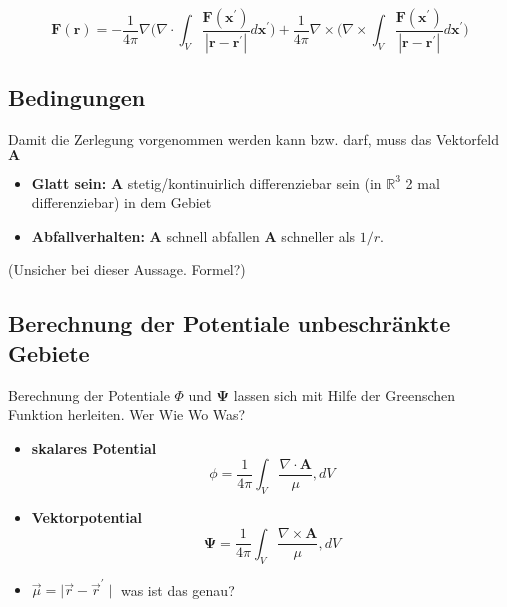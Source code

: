 \begin{equation}
\mathbf{F}(\mathbf{r}) = - \frac{1}{4 \pi} \nabla \bigg( \nabla \cdot \int_V \frac{\mathbf{F}(\mathbf{x}^{\prime})}{|\mathbf{r} - \mathbf{r}^{\prime}|} d\mathbf{x}^{\prime} \bigg) + \frac{1}{4 \pi} \nabla \times \bigg( \nabla \times \int_V \frac{\mathbf{F}(\mathbf{x}^{\prime})}{|\mathbf{r} - \mathbf{r}^{\prime}|} d\mathbf{x}^{\prime} \bigg)
\end{equation}


\subsection{Bedingungen
\label{helmholtz:subsection:Bedingung}}

Damit die Zerlegung vorgenommen werden kann bzw. darf, muss das Vektorfeld $\mathbf{A}$ 

\begin{itemize}
\item \textbf{Glatt sein:} $\mathbf{A}$ stetig/kontinuirlich differenziebar sein (in $\mathbb{R}^3$ 2 mal differenziebar) in dem Gebiet
\item \textbf{Abfallverhalten:} $\mathbf{A}$ schnell abfallen  $\mathbf{A}$ schneller als $1/r$. 
\end{itemize}
(Unsicher bei dieser Aussage. Formel?)


\subsection{Berechnung der Potentiale unbeschränkte Gebiete
\label{helmholtz:subsection:Berechnung}}


Berechnung der Potentiale $\Phi $ und $\mathbf{\Psi}$ lassen sich mit Hilfe der Greenschen Funktion herleiten. Wer Wie Wo Was?


\begin{itemize}
\item \textbf{skalares Potential}
\begin{equation}
\phi = \frac{1}{4 \pi} \int_{V} \frac{\nabla \cdot \mathbf{A}}{\mu}, dV
\end{equation}
\item \textbf{Vektorpotential}
\begin{equation}
\mathbf{\Psi} = \frac{1}{4 \pi} \int_{V} \frac{\nabla \times \mathbf{A}}{\mu}, dV
\end{equation}
\item $\vec{\mu} = \mid \vec{r} - \vec{r}^{\prime} \mid$ was ist das genau?
\end{itemize}

